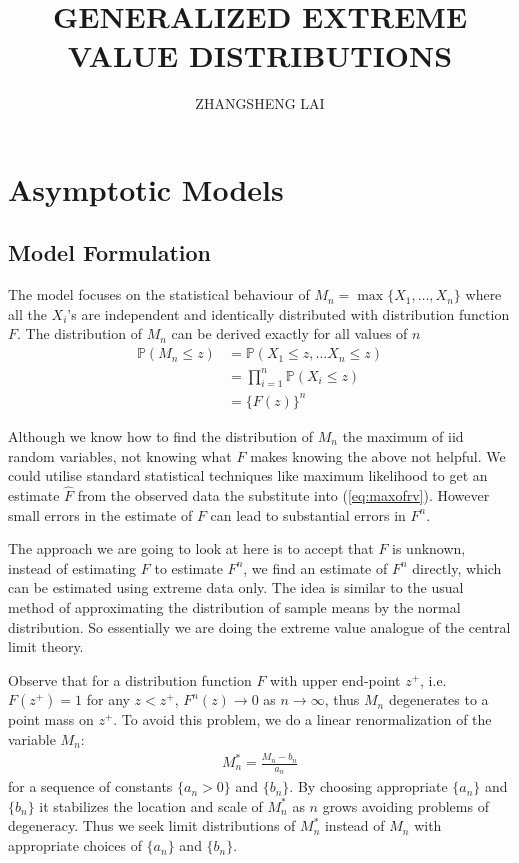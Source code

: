 \documentclass[a4paper,10pt]{article}
\theoremstyle{definition}
\numberwithin{equation}{section}
\begin{document}
\title{\large \bf GENERALIZED EXTREME VALUE DISTRIBUTIONS}
\author{\small ZHANGSHENG LAI}
\date{}
\maketitle

\section{Asymptotic Models}
\subsection{Model Formulation}
The model focuses on the statistical behaviour of $M_n = \max\{X_1,\ldots,X_n\}$ where all the $X_i$'s are independent and identically distributed with distribution function $F$. The distribution of $M_n$ can be derived exactly for all values of $n$
\begin{align}
\mathbb{P}(M_n\leq z) &= \mathbb{P}(X_1\leq z , \ldots X_n \leq z)\nonumber\\
&= \prod_{i=1}^{n}\mathbb{P}(X_i\leq z)\nonumber\\
&=\{F(z)\}^n \label{eq:maxofrv}
\end{align}

Although we know how to find the distribution of $M_n$ the maximum of iid random variables, not knowing what $F$ makes knowing the above not helpful. We could utilise standard statistical techniques like maximum likelihood to get an estimate $\widehat{F}$ from the observed data the substitute into (\ref{eq:maxofrv}). However small errors in the estimate of $F$ can lead to substantial errors in $F^n$.

The approach we are going to look at here is to accept that $F$ is unknown, instead of estimating $F$ to estimate $F^n$, we find an estimate of $F^n$ directly, which can be estimated using extreme data only. The idea is similar to the usual method of approximating the distribution of sample means by the normal distribution. So essentially we are doing the extreme value analogue of the central limit theory.

Observe that for a distribution function $F$ with upper end-point $z^+$, i.e. $F(z^+) = 1$ for any $z<z^+$, $F^n(z) \to 0$ as $n \to \infty$, thus $M_n$ degenerates to a point mass on $z^+$. To avoid this problem, we do a linear renormalization of the variable $M_n$:
\begin{align*}
M_n^\ast = \frac{M_n - b_n}{a_n}
\end{align*}
for a sequence of constants $\{a_n>0\}$ and $\{b_n\}$. By choosing appropriate $\{a_n\}$ and $\{b_n\}$ it stabilizes the location and scale of $M_n^\ast$ as $n$ grows avoiding problems of degeneracy. Thus we seek limit distributions of $M_n^\ast$ instead of $M_n$ with appropriate choices of $\{a_n\}$ and $\{b_n\}$.
\end{document}
